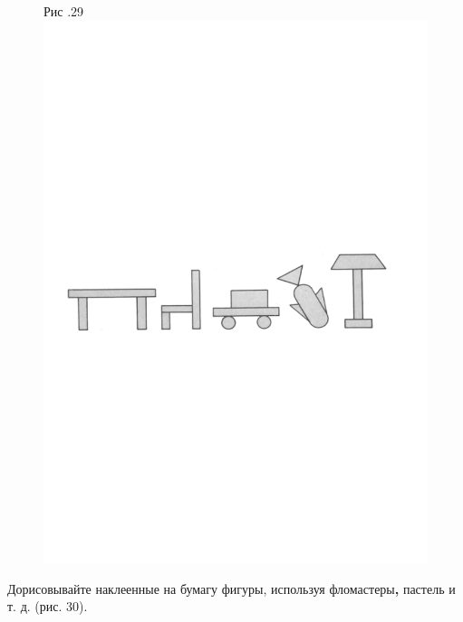 \documentclass[a5paper]{book}
\begin{document}
\begin{figure}
\centering
Рис .29 \includegraphics[width=\linewidth]{media/media/image26.png}
\end{figure}

Дорисовывайте наклеенные на бумагу фигуры, используя
фломастеры\textbf{,} пастель и т. д. (рис. 30).
\end{document}
